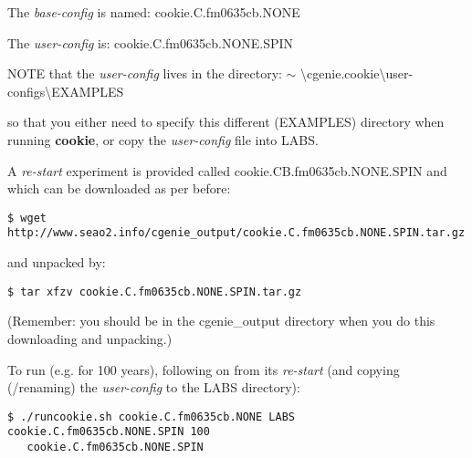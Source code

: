 \vspace{1mm}
The \textit{base-config} is named: \textsf{\footnotesize cookie.C.fm0635cb.NONE}

\vspace{1mm}
The \textit{user-config} is: \textsf{\footnotesize cookie.C.fm0635cb.NONE.SPIN}

\vspace{1mm}
NOTE that the \textit{user-config} lives in the directory: \textsf{\footnotesize \(\sim\) \textbackslash cgenie.cookie\textbackslash user-configs\textbackslash EXAMPLES}

\noindent so that you either need to specify this different (\textsf{\footnotesize EXAMPLES}) directory when running \textbf{cookie}, or copy the \textit{user-config} file into \textsf{\footnotesize LABS}.

\vspace{1mm}
A \textit{re-start }experiment is provided called \textsf{\footnotesize cookie.CB.fm0635cb.NONE.SPIN} and which can be downloaded as per before:

\vspace{-2mm}
\small\begin{verbatim}
$ wget http://www.seao2.info/cgenie_output/cookie.C.fm0635cb.NONE.SPIN.tar.gz
\end{verbatim}\normalsize
\vspace{-2mm}

\noindent and unpacked by:

\vspace{-2mm}
\small\begin{verbatim}
$ tar xfzv cookie.C.fm0635cb.NONE.SPIN.tar.gz
\end{verbatim}\normalsize
\vspace{-2mm}

\noindent (Remember: you should be in the \textsf{\footnotesize cgenie\_output} directory when you do this downloading and unpacking.)

To run (e.g. for 100 years), following on from its \textit{re-start} (and copying (/renaming) the \textit{user-config} to the \textsf{\footnotesize LABS} directory):

\vspace{-2mm}
\small\begin{verbatim}
$ ./runcookie.sh cookie.C.fm0635cb.NONE LABS cookie.C.fm0635cb.NONE.SPIN 100
   cookie.C.fm0635cb.NONE.SPIN
\end{verbatim}\normalsize
\vspace{-2mm}

